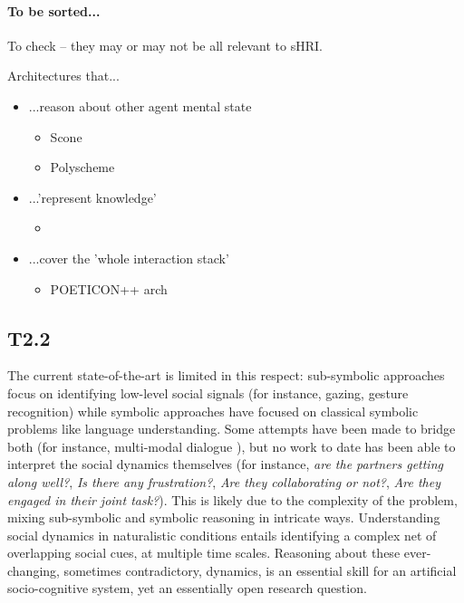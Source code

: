 \documentclass[11pt,a4paper]{report}
\begin{document}
\paragraph{To be sorted...}

To check -- they may or may not be all relevant to sHRI.

Architectures that...

\begin{itemize}
    \item ...reason about other agent mental state
    \begin{itemize}
        \item Scone~\cite{fahlman2011using}
        \item Polyscheme~\cite{bello2011shared}
    \end{itemize}
    \item ...'represent knowledge'
        \begin{itemize}
            \item \cite{zhang2014towards}
        \end{itemize}
    \item ...cover the 'whole interaction stack'
        \begin{itemize}
            \item POETICON++ arch~\cite{antunes2016from} 
        \end{itemize}
\end{itemize}

\subsection{T2.2}

The current state-of-the-art is limited in this respect: sub-symbolic
approaches focus on identifying low-level social signals (for instance,
gazing, gesture recognition) while symbolic approaches have focused on
classical symbolic problems like language understanding. Some attempts
have been made to bridge both (for instance, multi-modal dialogue
\cite{lemaignan2011grounding, lemaignan2017artificial}), but no work to
date has been able to interpret the social dynamics themselves (for
instance, \emph{are the partners getting along well?}, \emph{Is there
any frustration?}, \emph{Are they collaborating or not?}, \emph{Are they
engaged in their joint task?}). This is likely due to the complexity of
the problem, mixing sub-symbolic and symbolic reasoning in intricate
ways. Understanding social dynamics in naturalistic conditions entails
identifying a complex net of overlapping social cues, at multiple time
scales. Reasoning about these ever-changing, sometimes contradictory,
dynamics, is an essential skill for an artificial socio-cognitive
system, yet an essentially open research question.
\end{document}
